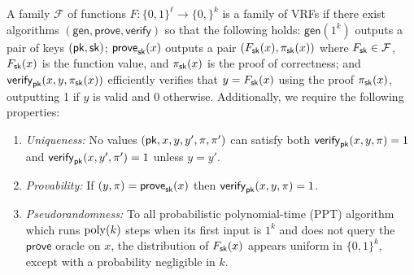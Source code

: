 \newcommand{\Gen}{\mathsf{gen}}
\newcommand{\Prove}{\mathsf{prove}}
\newcommand{\Verify}{\mathsf{verify}}
\begin{definition}\label{def:VRF}
  A family $\mathcal{F}$ 
  of functions $F : \{0,1\}^\ell \rightarrow \{0,\}^k$ 
  is a family of VRFs if there exist algorithms 
  $(\Gen, \Prove, \Verify)$ 
  so that the following holds: 
  $\Gen(1^k)$ outputs a pair of keys $(\mathsf{pk}, \mathsf{sk})$; 
  $\Prove_\sk(x)$ outputs a pair $(F_{\mathsf{sk}}(x), \pi_{\mathsf{sk}}(x))$ 
  where 
  $F_{\mathsf{sk}} \in \mathcal{F}$, $F_{\mathsf{sk}}(x)$ is the function value, and 
  $\pi_{\mathsf{sk}}(x)$ is the proof of correctness; and 
  $\Verify_\pk(x,y,\pi_\sk(x))$ efficiently verifies 
  that $y = F_{\mathsf{sk}}(x)$ using the proof $\pi_{\mathsf{sk}}(x)$, 
  outputting 1 if $y$ is valid and 0 otherwise. 
  Additionally, we require the following properties:

  \begin{enumerate}
    \item \emph{Uniqueness:} 
    No values $(\mathsf{pk}, x, y, y', \pi, \pi')$  can satisfy both 
    $\Verify_\pk(x,y,\pi) = 1$ and $\Verify_\pk(x,y',\pi') = 1$ 
    unless $y = y'$.

    \item \emph{Provability:} 
    If $(y, \pi) = \Prove_\sk(x)$ then $\Verify_\pk(x,y, \pi) = 1$.

    \item \emph{Pseudorandomness:} 
    To all probabilistic polynomial-time (PPT) algorithm 
    which runs $\mathrm{poly}(k)$ steps when its first input is $1^k$ 
    and does not query the $\Prove$ oracle on $x$, 
    the distribution of $F_{\mathsf{sk}}(x)$ appears uniform in $\{0,1\}^k$, 
    except with a probability negligible in $k$.
  \end{enumerate}

\end{definition}





